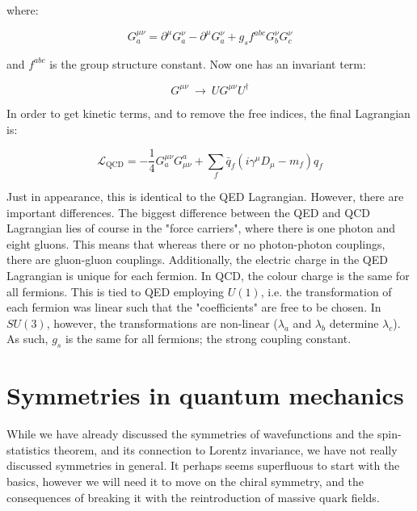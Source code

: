 \documentclass[10pt]{report}
\begin{document}
	where:
	
	\begin{equation}
	G_a^{\mu\nu} = \partial^\mu G_a^\nu - \partial^\mu G_a^\nu + g_sf^{abc}G_b^\nu G_c^\nu
	\end{equation}
	
	and $f^{abc}$ is the group structure constant. Now one has an invariant term:
	
	\begin{equation}
	G^{\mu\nu} \:\rightarrow\: UG^{\mu\nu}U^\dagger
	\end{equation}
	
	In order to get kinetic terms, and to remove the free indices, the final Lagrangian is:
	
	\begin{equation}
	\mathcal{L}_{\text{QCD}} = -\frac{1}{4}G_a^{\mu\nu}G_{\mu\nu}^a + \sum_f \bar{q}_f(i\gamma^\mu D_\mu - m_f)q_f
	\end{equation}
	
	Just in appearance, this is identical to the QED Lagrangian. However, there are important differences. The biggest difference between the QED and QCD Lagrangian lies of course in the "force carriers", where there is one photon and eight gluons. This means that whereas there or no photon-photon couplings, there are gluon-gluon couplings. Additionally, the electric charge in the QED Lagrangian is unique for each fermion. In QCD, the colour charge is the same for all fermions. This is tied to QED employing $U(1)$, i.e. the transformation of each fermion was linear such that the "coefficients" are free to be chosen. In $SU(3)$, however, the transformations are non-linear ($\lambda_a$ and $\lambda_b$ determine $\lambda_c$). As such, $g_s$ is the same for all fermions; the strong coupling constant.
	
	\section{Symmetries in quantum mechanics}
	While we have already discussed the symmetries of wavefunctions and the spin-statistics theorem, and its connection to Lorentz invariance, we have not really discussed symmetries in general. It perhaps seems superfluous to start with the basics, however we will need it to move on the chiral symmetry, and the consequences of breaking it with the reintroduction of massive quark fields.
	
\end{document}
